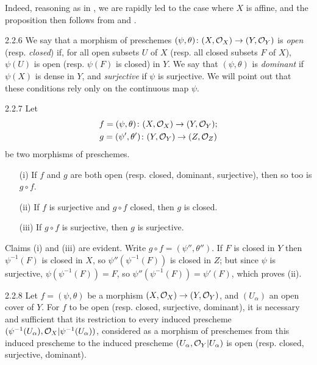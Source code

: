 Indeed, reasoning as in
, we are rapidly led to the case where $X$ is affine, and the proposition
then follows from  and .

\begin{env}{2.2.6}
\label{env-1.2.2.6}
We say that a morphism of preschemes
$(\psi,\theta)\colon(X,\mathcal{O}_X)\to(Y,\mathcal{O}_Y)$ is \emph{open} (resp. \emph{closed})
if, for all open subsets $U$ of $X$ (resp. all closed subsets $F$ of $X$),
$\psi(U)$ is open (resp. $\psi(F)$ is closed) in $Y$. We say that
$(\psi,\theta)$ is \emph{dominant} if $\psi(X)$ is dense in $Y$, and
\emph{surjective} if $\psi$ is surjective. We will point out that these
conditions rely only on the continuous map $\psi$.
\end{env}

\begin{env}[Proposition]{2.2.7}
\label{prop-1.2.2.7}
Let
\begin{gather*}
  f=(\psi,\theta)\colon(X,\mathcal{O}_X)\to(Y,\mathcal{O}_Y);\\
  g=(\psi',\theta')\colon(Y,\mathcal{O}_Y)\to(Z,\mathcal{O}_Z)
\end{gather*}
be two morphisms of
preschemes.
\begin{itemize}
  \item[(i)] If $f$ and $g$ are both open (resp. closed, dominant, surjective),
             then so too is $g\circ f$.
  \item[(ii)] If $f$ is surjective and $g\circ f$ closed, then $g$ is closed.
  \item[(iii)] If $g\circ f$ is surjective, then $g$ is surjective.
\end{itemize}
\end{env}
Claims (i) and (iii) are evident. Write $g\circ f=(\psi'',\theta'')$.
If $F$ is closed in $Y$ then $\psi^{-1}(F)$ is closed in $X$, so
$\psi''(\psi^{-1}(F))$ is closed in $Z$; but since $\psi$ is surjective,
$\psi(\psi^{-1}(F))=F$, so $\psi''(\psi^{-1}(F))=\psi'(F)$, which proves (ii).

\begin{env}[Proposition]{2.2.8}
\label{prop-1.2.2.8}
Let $f=(\psi,\theta)$ be a morphism
$(X,\mathcal{O}_X)\to(Y,\mathcal{O}_Y)$, and $(U_\alpha)$ an open cover of $Y$. For $f$ to be
open (resp. closed, surjective, dominant), it is necessary and sufficient that
its restriction to every induced prescheme
$(\psi^{-1}(U_\alpha),\mathcal{O}_X|\psi^{-1}(U_\alpha))$, considered as a morphism of
preschemes from this induced prescheme to the induced prescheme
$(U_\alpha,\mathcal{O}_Y|U_\alpha)$ is open (resp. closed, surjective, dominant).
\end{env}

